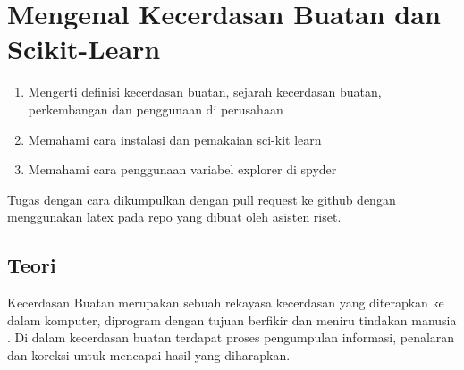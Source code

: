 \chapter{Mengenal Kecerdasan Buatan dan Scikit-Learn}

\begin{enumerate}
\item
Mengerti definisi kecerdasan buatan, sejarah kecerdasan buatan, perkembangan dan penggunaan di perusahaan
\item
Memahami cara instalasi dan pemakaian sci-kit learn
\item
Memahami cara penggunaan variabel explorer di spyder
\end{enumerate}
Tugas dengan cara dikumpulkan dengan pull request ke github dengan menggunakan latex pada repo yang dibuat oleh asisten riset.

\section{Teori}

Kecerdasan Buatan merupakan sebuah rekayasa kecerdasan yang diterapkan ke dalam komputer, diprogram dengan tujuan berfikir dan meniru tindakan manusia \cite{jmcai}. Di dalam kecerdasan buatan terdapat proses pengumpulan informasi, penalaran dan koreksi untuk mencapai hasil yang diharapkan.\cite{jfai}
\\
\\
